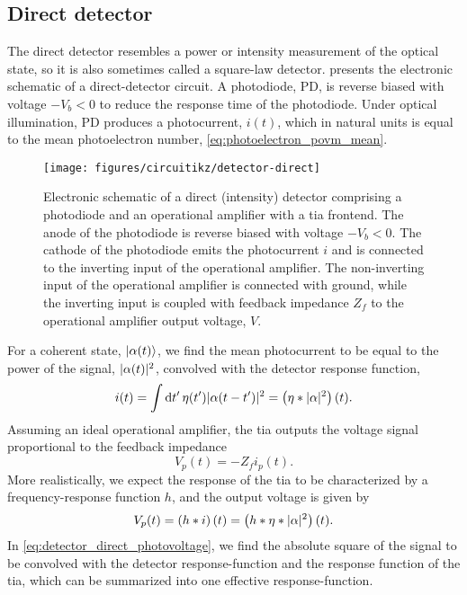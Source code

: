 \FloatBarrier
\subsection{Direct detector}

The direct detector resembles a power or intensity measurement of the optical state, so it is also sometimes called a square-law detector.
 presents the electronic schematic of a direct-detector circuit.
A photodiode, PD, is reverse biased with voltage $-V_b<0$ to reduce the response time of the photodiode.
Under optical illumination, PD produces a photocurrent, $i(t)$, which in natural units is equal to the mean photoelectron number, \cref{eq:photoelectron_povm_mean}.
\begin{figure}[htb]
    \centering
    \texttt{[image: figures/circuitikz/detector-direct]}
    \caption{Electronic schematic of a direct (intensity) detector comprising a photodiode and an operational amplifier with a \gls{tia} frontend. The anode of the photodiode is reverse biased with voltage $-V_b<0$. The cathode of the photodiode emits the photocurrent $i$ and is connected to the inverting input of the operational amplifier. The non-inverting input of the operational amplifier is connected with ground, while the inverting input is coupled with feedback impedance $Z_f$ to the operational amplifier output voltage, $V$.}\label{fig:detector_direct}
\end{figure}
For a coherent state, $\lvert\alpha(t)\rangle$, we find the mean photocurrent to be equal to the power of the signal, $\lvert\alpha(t)\rvert^2$, convolved with the detector response function,
\begin{equation}
	i(t)
	=
	\int\dd{t^\prime}
	\eta(t^\prime)
	\abs{\alpha(t-t^\prime)}^2
	=
	\left(\eta\conv\abs{\alpha}^2\right)(t)
	\label{eq:detector_direct_photocurrent}
	.
\end{equation}
Assuming an ideal operational amplifier, the \gls{tia} outputs the voltage signal proportional to the feedback impedance
\begin{equation}
	V_p(t)
	=
	-
	Z_f
	i_p(t)
	.
\end{equation}
More realistically, we expect the response of the \gls{tia} to be characterized by a frequency-response function $h$, and the output voltage is given by
\begin{equation}
	V_p(t)
	=
	\left(h\ast i\right)(t)
	=
	\left(h\ast\eta\ast\lvert\alpha\rvert^2\right)(t)
	\label{eq:detector_direct_photovoltage}
	.
\end{equation}
In \cref{eq:detector_direct_photovoltage}, we find the absolute square of the signal to be convolved with the detector response-function and the response function of the \gls{tia}, which can be summarized into one effective response-function.

